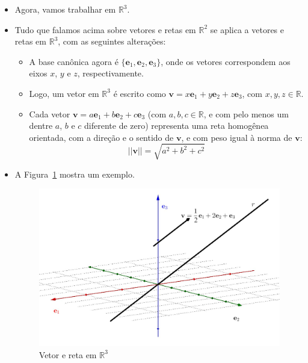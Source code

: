\documentclass[
  letterpaper,
  DIV=11,
  numbers=noendperiod]{scrreprt}
\begin{document}
\begin{itemize}
\item
  Agora, vamos trabalhar em $\mathbb{R}^3$.
\item
  Tudo que falamos acima sobre vetores e retas em $\mathbb{R}^2$ se
  aplica a vetores e retas em $\mathbb{R}^3$, com as seguintes
  alterações:

  \begin{itemize}
  \item
    A base canônica agora é
    $\{ \mathbf{e}_{1}, \mathbf{e}_{2}, \mathbf{e}_{3} \}$, onde os
    vetores correspondem aos eixos $x$, $y$ e $z$, respectivamente.
  \item
    Logo, um vetor em $\mathbb{R}^3$ é escrito como
    $\mathbf{v} = x\mathbf{e}_{1} + y\mathbf{e}_{2} + z\mathbf{e}_{3}$,
    com $x, y, z \in \mathbb{R}$.
  \item
    Cada vetor
    $\mathbf{v} = a\mathbf{e}_{1} + b\mathbf{e}_{2} + c\mathbf{e}_{3}$
    (com $a, b, c \in \mathbb{R}$, e com pelo menos um dentre $a$, $b$ e
    $c$ diferente de zero) representa uma reta homogênea orientada, com
    a direção e o sentido de $\mathbf{v}$, e com peso igual à norma de
    $\mathbf{v}$: \[
    ||\mathbf{v}|| = \sqrt{a^2 + b^2 + c^2}
    \]
  \end{itemize}
\item
  A Figura~\ref{fig-reta-r3} mostra um exemplo.

  \begin{figure}[htb]

  {\centering \includegraphics[width=1\textwidth,height=\textheight]{figures/reta-r3.png}

  }

  \caption{\label{fig-reta-r3}Vetor e reta em $\mathbb{R}^3$}

  \end{figure}
\end{itemize}
\end{document}

